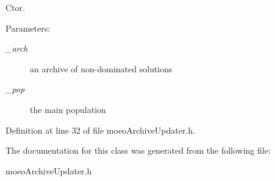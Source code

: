 Ctor. 

\begin{Desc}
\item[Parameters:]
\begin{description}
\item[{\em \_\-arch}]an archive of non-dominated solutions \item[{\em \_\-pop}]the main population \end{description}
\end{Desc}


Definition at line 32 of file moeo\-Archive\-Updater.h.

The documentation for this class was generated from the following file:\begin{CompactItemize}
\item 
moeo\-Archive\-Updater.h\end{CompactItemize}
